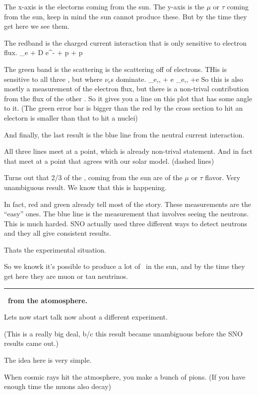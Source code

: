 {The x-axis is the electorns \nus coming from the sun. 
The y-axis is the $\mu$ or $\tau$ \nus coming from the sun, keep in mind the sun cannot produce these.
But by the time they get here we see them. 

The redband is the charged current interaction that is only sensitive to electron flux. 
\be
\nu_e + D \rightarrow e^- + p + p
\ee 

The green band is the scattering is the scattering off of electrons.
THis is sensitive to all three \nus, but where $\nu_e$s dominate.
\be
\nu_{e,\mu,\tau} + e  \rightarrow \nu_{e,\mu,\tau} +e
\ee
So this is also mostly a measurement of the electron flux, but there is a non-trival contribution from the flux of the other \nus. 
So it gives you a line on this plot that has some angle to it. 
(The green error bar is bigger than the red by the cross section to hit an electorn is smaller than that to hit a nuclei) 

And finally, the last result is the blue line from the neutral current interaction. 

All three lines meet at a point, which is already non-trival statement. 
And in fact that meet at a point that agrees with our solar model. (dashed lines) 

Turns out that 2/3 of the \nus, coming from the sun are of the $\mu$ or $\tau$ flavor.
Very unambiguous result.
We know that this is happening.

In fact, red and green already tell most of the story. 
These measurements are the ``easy'' ones. 
The blue line is the measurement that involves seeing the neutrons. 
This is much harded. 
SNO actually used three different ways to detect neutrons and they all give consistent results. 

Thats the experimental situation. 

So we knowk it's possible to produce a lot of \nus\ in the sun, and by the time they get here they are muon or tau neutrinos.

\noindent\rule{\textwidth}{1pt}

\textbf{\nus\ from the atomosphere.}

Lets now start talk now about a different experiment. 

(This is a really big deal, b/c this result became unambiguous before the SNO results came out.)

The idea here is very simple. 

When cosmic rays hit the atmosphere, you make a bunch of pions.  (If you have enough time the muons also decay) 

}
